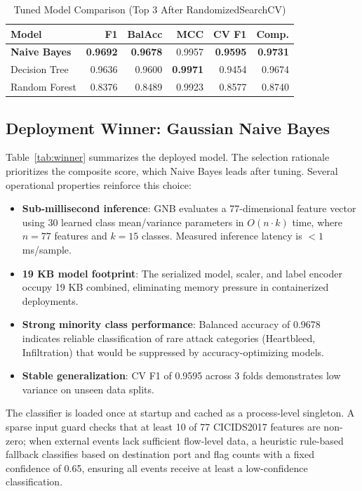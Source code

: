 \documentclass[conference]{IEEEtran}
\begin{document}
\begin{table}[h]
\caption{Tuned Model Comparison (Top 3 After RandomizedSearchCV)}
\label{tab:tuned}
\centering
\begin{tabular}{@{}lrrrrr@{}}
\toprule
\textbf{Model} & \textbf{F1} & \textbf{BalAcc} & \textbf{MCC} & \textbf{CV F1} & \textbf{Comp.} \\
\midrule
\textbf{Naive Bayes}  & \textbf{0.9692} & \textbf{0.9678} & 0.9957 & \textbf{0.9595} & \textbf{0.9731} \\
Decision Tree         & 0.9636 & 0.9600 & \textbf{0.9971} & 0.9454 & 0.9674 \\
Random Forest         & 0.8376 & 0.8489 & 0.9923 & 0.8577 & 0.8740 \\
\bottomrule
\end{tabular}
\end{table}

\subsection{Deployment Winner: Gaussian Naive Bayes}

Table~\ref{tab:winner} summarizes the deployed model. The selection rationale prioritizes the composite score, which Naive Bayes leads after tuning. Several operational properties reinforce this choice:

\begin{itemize}
    \item \textbf{Sub-millisecond inference}: GNB evaluates a 77-dimensional feature vector using 30 learned class mean/variance parameters in $O(n \cdot k)$ time, where $n=77$ features and $k=15$ classes. Measured inference latency is $<1$ ms/sample.
    \item \textbf{19 KB model footprint}: The serialized model, scaler, and label encoder occupy 19 KB combined, eliminating memory pressure in containerized deployments.
    \item \textbf{Strong minority class performance}: Balanced accuracy of 0.9678 indicates reliable classification of rare attack categories (Heartbleed, Infiltration) that would be suppressed by accuracy-optimizing models.
    \item \textbf{Stable generalization}: CV F1 of 0.9595 across 3 folds demonstrates low variance on unseen data splits.
\end{itemize}

The classifier is loaded once at startup and cached as a process-level singleton. A sparse input guard checks that at least 10 of 77 CICIDS2017 features are non-zero; when external events lack sufficient flow-level data, a heuristic rule-based fallback classifies based on destination port and flag counts with a fixed confidence of 0.65, ensuring all events receive at least a low-confidence classification.
\end{document}
